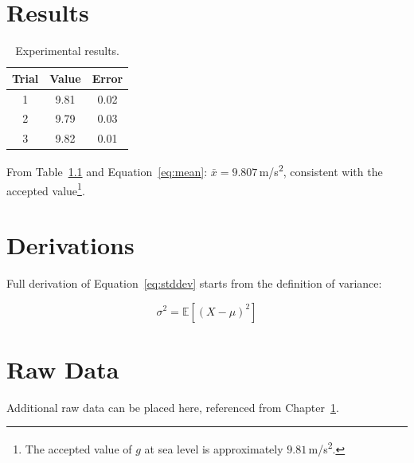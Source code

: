 \documentclass[12pt, a4paper]{report}
\begin{document}
\chapter{Results}
\label{chap:results}

\begin{table}[ht]
\centering
\begin{tabular}{ccc}
    \hline
    \textbf{Trial} & \textbf{Value} & \textbf{Error} \\
    \hline
    1 & 9.81 & 0.02 \\
    2 & 9.79 & 0.03 \\
    3 & 9.82 & 0.01 \\
    \hline
\end{tabular}
\caption{Experimental results.}
\label{tab:results}
\end{table}

From Table~\ref{tab:results} and Equation~\eqref{eq:mean}:
$\bar{x} = 9.807$\,m/s\textsuperscript{2}, consistent with the accepted
value\footnote{The accepted value of $g$ at sea level is approximately
$9.81$\,m/s\textsuperscript{2}.}.

\appendix

\chapter{Derivations}
\label{app:derivations}

Full derivation of Equation~\eqref{eq:stddev} starts from the definition
of variance:

\begin{equation}
    \sigma^2 = \mathbb{E}[(X - \mu)^2]
\end{equation}

\chapter{Raw Data}
\label{app:data}

Additional raw data can be placed here, referenced from
Chapter~\ref{chap:results}.
\end{document}
